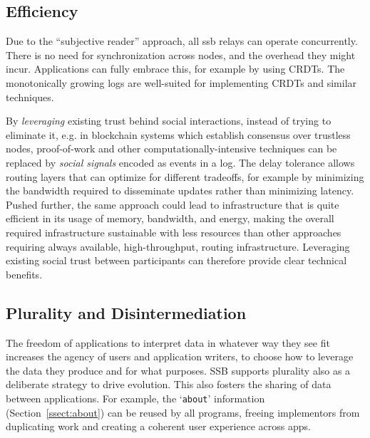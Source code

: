 \documentclass[9pt,sigconf,rewiew]{acmart}
\begin{document}



\subsection{Efficiency}

Due to the ``subjective reader'' approach, all ssb relays can operate concurrently. There is no need for synchronization across nodes, and the overhead they might incur. Applications can fully embrace this, for example by using CRDTs. The monotonically growing logs are well-suited for implementing CRDTs and similar techniques.

By {\em leveraging} existing trust behind social interactions, instead of trying to eliminate it, e.g. in blockchain systems which establish consensus over trustless nodes, proof-of-work and other computationally-intensive techniques can be replaced by \textit{social signals} encoded as events in a log. The delay tolerance allows routing layers that can optimize for different tradeoffs, for example by minimizing the bandwidth required to disseminate updates rather than minimizing latency. Pushed further, the same approach could lead to infrastructure that is quite efficient in its usage of memory, bandwidth, and energy, making the overall required infrastructure sustainable with less resources than other approaches requiring always available, high-throughput, routing infrastructure. Leveraging existing social trust between participants can therefore provide clear technical benefits.

\subsection{Plurality and Disintermediation}


The freedom of applications to interpret data in whatever way they see fit increases the agency of users and application writers, to choose how to leverage the data they produce and for what purposes. SSB supports plurality also as a deliberate strategy to drive evolution. This also fosters the sharing of data between applications. For example, the `{\small\tt about}' information (Section~\ref{ssect:about}) can be reused by all programs, freeing implementors from duplicating work and creating a coherent user experience across apps.
\end{document}
